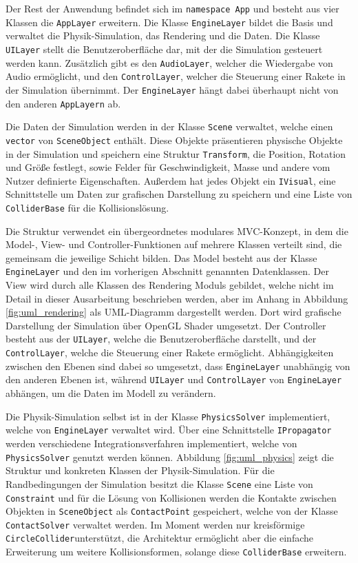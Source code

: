 \documentclass[10pt,twocolumn]{extarticle}
\begin{document}
Der Rest der Anwendung befindet sich im \texttt{namespace App} und besteht aus vier Klassen die \texttt{AppLayer} erweitern. Die Klasse \texttt{EngineLayer} bildet die Basis und verwaltet die Physik-Simulation, das Rendering und die Daten. Die Klasse \texttt{UILayer} stellt die Benutzeroberfläche dar, mit der die Simulation gesteuert werden kann. Zusätzlich gibt es den \texttt{AudioLayer}, welcher die Wiedergabe von Audio ermöglicht, und den \texttt{ControlLayer}, welcher die 
Steuerung einer Rakete in der Simulation übernimmt.
Der \texttt{EngineLayer} hängt dabei überhaupt nicht von den anderen \texttt{AppLayern} ab.

Die Daten der Simulation werden in der Klasse \texttt{Scene} verwaltet, welche einen \texttt{vector} von \texttt{SceneObject} enthält. Diese Objekte präsentieren physische Objekte in der Simulation und speichern eine Struktur \texttt{Transform}, die Position, Rotation und Größe festlegt, sowie Felder für Geschwindigkeit, Masse und andere vom Nutzer definierte Eigenschaften. Außerdem hat jedes Objekt ein \texttt{IVisual}, eine Schnittstelle um Daten zur grafischen Darstellung zu speichern und eine Liste von \texttt{ColliderBase} für die Kollisionslösung.

Die Struktur verwendet ein übergeordnetes modulares MVC-Konzept, in dem die Model-, View- und Controller-Funktionen auf mehrere Klassen verteilt sind, die gemeinsam die jeweilige Schicht bilden. Das Model besteht aus der Klasse \texttt{EngineLayer} und den im vorherigen Abschnitt genannten Datenklassen. Der View wird durch alle Klassen des Rendering Moduls gebildet, welche nicht im Detail in dieser Ausarbeitung beschrieben werden, aber im Anhang in Abbildung \ref{fig:uml_rendering} als UML-Diagramm dargestellt werden. Dort wird grafische Darstellung der Simulation über OpenGL Shader umgesetzt. Der Controller besteht aus der \texttt{UILayer}, welche die Benutzeroberfläche darstellt, und der \texttt{ControlLayer}, welche die Steuerung einer Rakete ermöglicht. Abhängigkeiten zwischen den Ebenen sind dabei so umgesetzt, dass \texttt{EngineLayer} unabhängig von den anderen Ebenen ist, während \texttt{UILayer} und \texttt{ControlLayer} von \texttt{EngineLayer} abhängen, um die Daten im Modell zu verändern.

Die Physik-Simulation selbst ist in der Klasse \texttt{PhysicsSolver} implementiert, welche von \texttt{EngineLayer} verwaltet wird. Über eine Schnittstelle \texttt{IPropagator} werden verschiedene Integrationsverfahren implementiert, welche von \texttt{PhysicsSolver} genutzt werden können. Abbildung \ref{fig:uml_physics} zeigt die Struktur und konkreten Klassen der Physik-Simulation. Für die Randbedingungen der Simulation besitzt die Klasse \texttt{Scene} eine Liste von \texttt{Constraint} und für die Lösung von Kollisionen werden die Kontakte zwischen Objekten in \texttt{SceneObject} als \texttt{ContactPoint} gespeichert, welche von der Klasse \texttt{ContactSolver} verwaltet werden. Im Moment werden nur kreisförmige \texttt{CircleCollider}unterstützt, die Architektur ermöglicht aber die einfache Erweiterung um weitere Kollisionsformen, solange diese \texttt{ColliderBase} erweitern.
\end{document}
